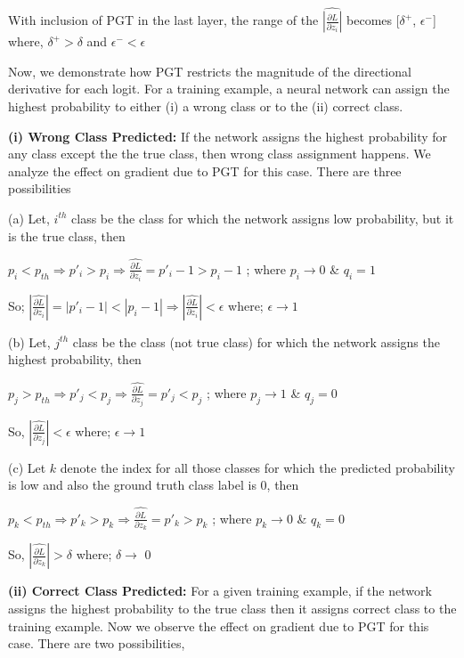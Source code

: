 \documentclass[times,sort&compress]{elsarticle}
\begin{document}
With inclusion of PGT in the last layer, the range of the $\widehat{|\frac{\partial
L}{\partial z_i}|}$ becomes [$\delta^+$, $\epsilon^-$] where, $\delta^+>\delta$ and
$\epsilon^-<\epsilon$


Now, we demonstrate how PGT restricts the magnitude of the directional derivative for
each logit. For a training example, a neural network can assign the highest probability
to either (i) a wrong class or to the (ii) correct class. 

\textbf{(i) Wrong Class Predicted:}
If the network assigns the highest probability for any class except the the true class,
then wrong class assignment happens. We analyze the effect on gradient due to PGT for
this case. There are three possibilities

(a) Let, $i^{th}$ class be the class for which the network assigns low probability, but
it is the true class, then

$p_i < p_{th} \Rightarrow p'_i > p_i \Rightarrow \widehat{\frac{\partial L}{\partial
z_i}} = p'_i -1 >  p_i -1 $ ; where $p_i\rightarrow 0$ \& $q_i = 1$

So; $|\widehat{\frac{\partial L}{\partial z_i}}| = |p'_i -1| <  |p_i -1| \Rightarrow
|\widehat{\frac{\partial L}{\partial z_i}}| <\epsilon $ where; $\epsilon\rightarrow 1$

(b) Let, $j^{th}$ class be the class (not true class) for which the network assigns the
highest probability, then

$p_j > p_{th} \Rightarrow p'_j < p_j \Rightarrow \widehat{\frac{\partial L}{\partial
z_j}} = p'_j <  p_j$ ; where $p_j\rightarrow 1$ \& $q_j = 0$

So, $|\widehat{\frac{\partial L}{\partial z_j}}| <\epsilon$ where; $\epsilon\rightarrow
1$



(c) Let $k$ denote the index for all those classes for which the predicted probability
is low and also the ground truth class label is $0$, then

$p_k < p_{th} \Rightarrow p'_k > p_k \Rightarrow \widehat{\frac{\partial L}{\partial
z_k}} = p'_k >  p_k$ ; where $p_k\rightarrow 0$ \& $q_k = 0$

So, $|\widehat{\frac{\partial L}{\partial z_k}}| >\delta$ where; $\delta\rightarrow$ 0

\textbf{(ii) Correct Class Predicted:}
For a given training example, if the network assigns the highest probability to the true
class then it assigns correct class to the training example. Now we observe the effect
on gradient due to PGT for this case. There are two possibilities,
\end{document}
